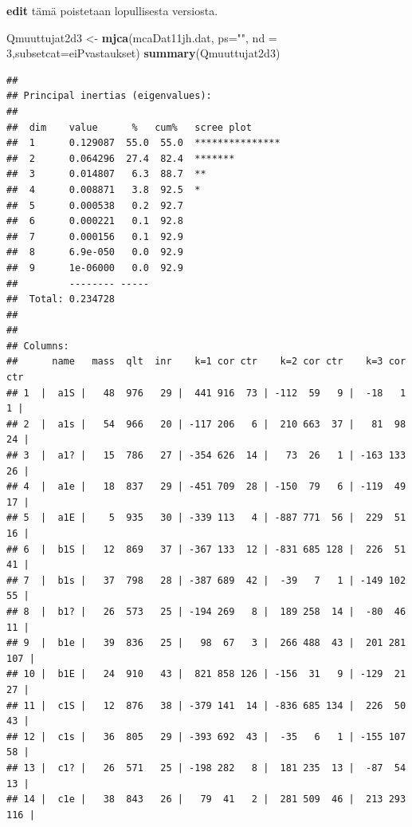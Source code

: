 \documentclass[
  finnish,
]{book}
\newenvironment{Shaded}{\begin{snugshade}}{\end{snugshade}}
\newcommand{\DataTypeTok}[1]{\textcolor[rgb]{0.13,0.29,0.53}{#1}}
\newcommand{\DecValTok}[1]{\textcolor[rgb]{0.00,0.00,0.81}{#1}}
\newcommand{\KeywordTok}[1]{\textcolor[rgb]{0.13,0.29,0.53}{\textbf{#1}}}
\newcommand{\NormalTok}[1]{#1}
\newcommand{\StringTok}[1]{\textcolor[rgb]{0.31,0.60,0.02}{#1}}
\begin{document}
\textbf{edit} tämä poistetaan lopullisesta versiosta.

\begin{Shaded}
\begin{Highlighting}[]
\NormalTok{Qmuuttujat2d3  <-}\StringTok{ }\KeywordTok{mjca}\NormalTok{(mcaDat11jh.dat, }\DataTypeTok{ps=}\StringTok{""}\NormalTok{, }\DataTypeTok{nd =} \DecValTok{3}\NormalTok{,}\DataTypeTok{subsetcat=}\NormalTok{eiPvastaukset)}
\KeywordTok{summary}\NormalTok{(Qmuuttujat2d3)}
\end{Highlighting}
\end{Shaded}

\begin{verbatim}
## 
## Principal inertias (eigenvalues):
## 
##  dim    value      %   cum%   scree plot               
##  1      0.129087  55.0  55.0  ***************          
##  2      0.064296  27.4  82.4  *******                  
##  3      0.014807   6.3  88.7  **                       
##  4      0.008871   3.8  92.5  *                        
##  5      0.000538   0.2  92.7                           
##  6      0.000221   0.1  92.8                           
##  7      0.000156   0.1  92.9                           
##  8      6.9e-050   0.0  92.9                           
##  9      1e-06000   0.0  92.9                           
##         -------- -----                                 
##  Total: 0.234728                                       
## 
## 
## Columns:
##      name   mass  qlt  inr    k=1 cor ctr    k=2 cor ctr    k=3 cor ctr  
## 1  |  a1S |   48  976   29 |  441 916  73 | -112  59   9 |  -18   1   1 |
## 2  |  a1s |   54  966   20 | -117 206   6 |  210 663  37 |   81  98  24 |
## 3  |  a1? |   15  786   27 | -354 626  14 |   73  26   1 | -163 133  26 |
## 4  |  a1e |   18  837   29 | -451 709  28 | -150  79   6 | -119  49  17 |
## 5  |  a1E |    5  935   30 | -339 113   4 | -887 771  56 |  229  51  16 |
## 6  |  b1S |   12  869   37 | -367 133  12 | -831 685 128 |  226  51  41 |
## 7  |  b1s |   37  798   28 | -387 689  42 |  -39   7   1 | -149 102  55 |
## 8  |  b1? |   26  573   25 | -194 269   8 |  189 258  14 |  -80  46  11 |
## 9  |  b1e |   39  836   25 |   98  67   3 |  266 488  43 |  201 281 107 |
## 10 |  b1E |   24  910   43 |  821 858 126 | -156  31   9 | -129  21  27 |
## 11 |  c1S |   12  876   38 | -379 141  14 | -836 685 134 |  226  50  43 |
## 12 |  c1s |   36  805   29 | -393 692  43 |  -35   6   1 | -155 107  58 |
## 13 |  c1? |   26  571   25 | -198 282   8 |  181 235  13 |  -87  54  13 |
## 14 |  c1e |   38  843   26 |   79  41   2 |  281 509  46 |  213 293 116 |

\end{verbatim}
\end{document}
